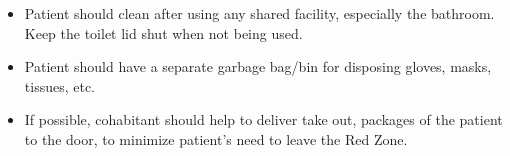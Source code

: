 \documentclass[onecolumn,journal]{IEEEtran}
\begin{document}
\begin{multicols}{2}
\begin{itemize}
\item Patient should clean after using any shared facility, especially the bathroom. Keep the toilet lid shut when not being used.

\item Patient should have a separate garbage bag/bin for disposing gloves, masks, tissues, etc.

\item If possible, cohabitant should help to deliver take out, packages of the patient to the door, to minimize patient's need to leave the Red Zone.
\end{itemize}

\end{multicols}
		

	
% 
\end{document}
